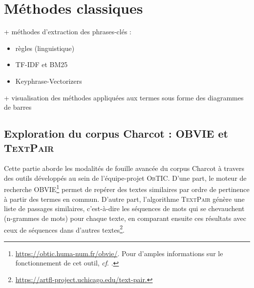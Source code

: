 \chapter{Méthodes classiques}
\minitoc
\label{resultats}


 + méthodes d'extraction des phrases-clés :
\begin{itemize}
	\item règles (linguistique)
	\item TF-IDF et BM25
	\item Keyphrase-Vectorizers
\end{itemize}

+ visualisation des méthodes appliquées aux termes sous forme des diagrammes de barres
\section{Exploration du corpus Charcot : \textsc{OBVIE} et \textsc{TextPair}}
\label{sect:obvie_textpair}
Cette partie aborde les modalités de fouille avancée du corpus Charcot à travers des outils développés au sein de l'équipe-projet \textsc{ObTIC}. D'une part, le moteur de recherche \textsc{OBVIE}\footnote{\url{https://obtic.huma-num.fr/obvie/}. Pour d'amples informations sur le fonctionnement de cet outil, \textit{cf}. \citet{alrahabi2022obvie}.} permet de repérer des textes similaires par ordre de pertinence à partir des termes en commun. D'autre part, l'algorithme \textsc{TextPair} génère une liste de passages similaires, c'est-à-dire les séquences de mots qui se chevauchent (n-grammes de mots) pour chaque texte, en comparant ensuite ces résultats avec ceux de séquences dans d'autres textes\footnote{\url{https://artfl-project.uchicago.edu/text-pair.}}.


